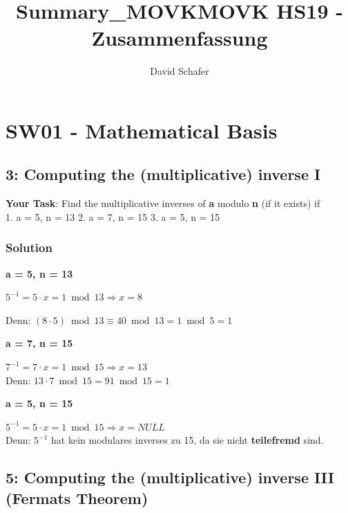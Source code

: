 \documentclass[11pt]{article}
\title{Summary\_MOVK}
\begin{document}
    \title{MOVK HS19 - Zusammenfassung}
	\author{David Schafer}
    \maketitle 
    
    

    
\setcounter{secnumdepth}{1}
\setcounter{tocdepth}{2}
\tableofcontents

    
\newpage

    \hypertarget{sw01---mathematical-basis}{%
\section{SW01 - Mathematical Basis}\label{sw01---mathematical-basis}}

    \hypertarget{computing-the-multiplicative-inverse-i}{%
\subsection{3: Computing the (multiplicative) inverse
I}\label{computing-the-multiplicative-inverse-i}}

\textbf{Your Task}: Find the multiplicative inverses of \textbf{a}
modulo \textbf{n} (if it exists) if\\
1. a = 5, n = 13 2. a = 7, n = 15 3. a = 5, n = 15

    \hypertarget{solution}{%
\subsubsection{Solution}\label{solution}}

\textbf{a = 5, n = 13}

\(5^{-1} = 5 \cdot x = 1 \bmod 13 \Rightarrow x = 8\)

Denn: \((8 \cdot 5) \bmod 13 \equiv 40 \bmod 13 = 1 \bmod 5 = 1\)

\textbf{a = 7, n = 15}

\(7^{-1} = 7 \cdot x = 1 \bmod 15 \Rightarrow x = 13\)\\
Denn: \(13 \cdot 7 \bmod 15 = 91 \bmod 15 = 1\)

\textbf{a = 5, n = 15}

\(5^{-1} = 5 \cdot x = 1 \bmod 15 \Rightarrow x = NULL\)\\
Denn: \(5^{-1}\) hat kein modulares inverses zu 15, da sie nicht
\textbf{teilefremd} sind.

    \hypertarget{computing-the-multiplicative-inverse-iii-fermats-theorem}{%
\subsection{5: Computing the (multiplicative) inverse III (Fermats
Theorem)}\label{computing-the-multiplicative-inverse-iii-fermats-theorem}}
\end{document}
